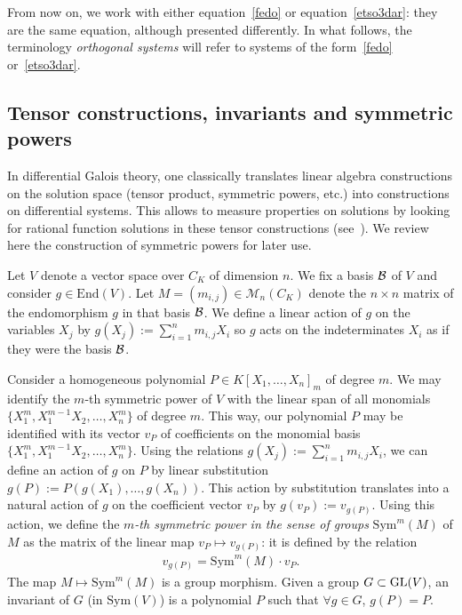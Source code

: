 \documentclass[pdftex]{sigma}%
\numberwithin{equation}{section}
\def\Sym{\mathrm{Sym}}
\begin{document}
From now on, we work with either equation~\eqref{fedo} or equation~\eqref{etso3dar}: they are the same equation, although presented differently.
In what follows, the terminology \emph{orthogonal systems} will refer to systems of the form~\eqref{fedo} or~\eqref{etso3dar}.



\subsection{Tensor constructions, invariants and symmetric powers}\label{tensor-constructions}

In differential Galois theory, one classically translates linear algebra constructions on the solution space (tensor product, symmetric powers, etc.) into constructions on differential systems. This allows to measure properties on solutions by looking for rational function solutions in these tensor constructions (see~\cite[Chapters~3 and~4]{PS}). We review here the construction of symmetric powers for later use.

Let $V$ denote a vector space over $C_K$ of dimension $n$. We fix a basis $\cal{B}$ of $V$ and consider $g\in \mathrm{End}(V)$. Let
$M = (m_{i,j}) \in {\mathcal M}_{n}(C_K)$ denote the $n\times n$ matrix of the endomorphism $g$ in that basis $\cal{B}$.
We define a linear action of $g$
on the variables $X_{j}$ by $g(X_{j}):=\sum_{i=1}^n m_{i,j} X_{i}$ so $g$ acts on the indeterminates $X_i$ as if they were the basis $\cal{B}$.

Consider a homogeneous polynomial
$P\in K[X_{1},\ldots,X_{n}]_{m}$ of degree $m$.
We may identify the $m$-th symmetric power of $V$ with the linear span of all monomials
$\{X_{1}^{m}, X_{1}^{m-1}X_{2}, \ldots, X_{n}^{m}\}$ of degree $m$. This way, our polynomial $P$ may be identified with its vector $v_{P}$ of coefficients on the monomial basis $\{X_{1}^{m}, X_{1}^{m-1}X_{2}, \ldots,X_{n}^{m}\}$.
Using the relations $g(X_{j}):=\sum_{i=1}^n m_{i,j} X_{i}$, we can define an action of
$g$ on $P$ by linear substitution $g(P):=P(g(X_{1}),\ldots, g(X_{n}))$.
This action by substitution translates into a natural action of $g$ on the coefficient vector $v_{P}$
by $g(v_{P}):=v_{g(P)}$.
Using this action, we define the \emph{$m$-th symmetric power in the sense of groups} $\Sym^m(M)$ of $M$ as the matrix of the linear map $v_{P} \mapsto v_{g(P)}$: it is defined by the relation
\begin{gather*}
v_{g(P)}=\Sym^m(M) \cdot v_{P}.
\end{gather*}
The map $M \mapsto \Sym^m(M)$ is a group morphism.
Given a group $G\subset {\rm GL}(V)$, an invariant of $G$ (in $\Sym(V)$) is a polynomial $P$ such that $\forall g\in G$, $g(P)=P$.
\end{document}
